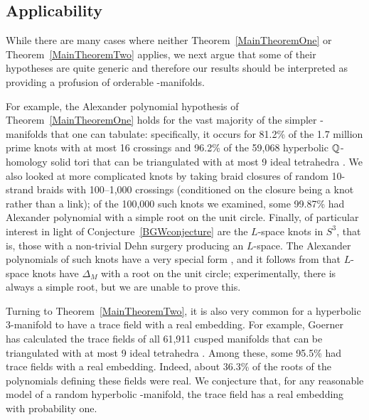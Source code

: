 \documentclass[tikz, sepfignums, defaultenums]{nmd/article}
\begin{document}
\subsection{Applicability}

While there are many cases where neither Theorem~\ref{MainTheoremOne}
or Theorem~\ref{MainTheoremTwo} applies, we next argue that some of
their hypotheses are quite generic and therefore our results should be
interpreted as providing a profusion of orderable \3-manifolds.

For example, the Alexander polynomial hypothesis of
Theorem~\ref{MainTheoremOne} holds for the vast majority of the
simpler \3-manifolds that one can tabulate: specifically, it occurs
for 81.2\% of the 1.7 million prime knots with at most 16 crossings
\cite{HosteThistlethwaiteWeeks1998} and 96.2\% of the 59{,}068
hyperbolic ${\mathbb Q}$-homology solid tori that can be triangulated with at
most 9 ideal tetrahedra \cite{Burton2014}.  We also looked at more
complicated knots by taking braid closures of random 10-strand braids
with 100--1{,}000 crossings (conditioned on the closure being a knot
rather than a link); of the 100{,}000 such knots we examined, some
99.87\% had Alexander polynomial with a simple root on the unit
circle.  Finally, of particular interest in light of
Conjecture~\ref{BGWconjecture} are the $L$-space knots in $S^3$, that
is, those with a non-trivial Dehn surgery producing an $L$-space.  The
Alexander polynomials of such knots have a very special form
\cite[Corollary~1.3]{OSLensSpace2005}, and it follows from
\cite{KonvalinaMatache2004} that $L$-space knots have $\Delta_M$ with
a root on the unit circle; experimentally, there is always a simple
root, but we are unable to prove this.

Turning to Theorem~\ref{MainTheoremTwo}, it is also very common for a
hyperbolic 3-manifold to have a trace field with a real embedding.
For example, Goerner~\cite{GoernerDatabase} has calculated the trace
fields of all 61{,}911 cusped manifolds that can be triangulated with
at most 9 ideal tetrahedra \cite{Burton2014}.  Among these, some
95.5\% had trace fields with a real embedding.  Indeed, about 36.3\%
of the roots of the polynomials defining these fields were real.  We
conjecture that, for any reasonable model of a random hyperbolic
\3-manifold, the trace field has a real embedding with probability
one.
\end{document}
